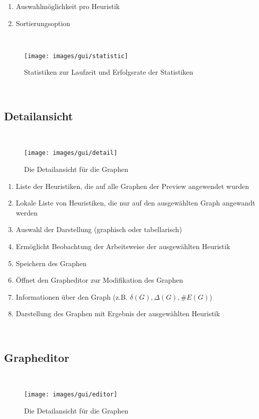 \documentclass{article}
\begin{document}
	\begin{enumerate}[(1)]
		\item{Auswahlmöglichkeit pro Heuristik}
		\item{Sortierungsoption}
	\end{enumerate}
	
	~\begin{figure}[!h]
		\centering
		\texttt{[image: images/gui/statistic]}
		\caption{Statistiken zur Laufzeit und Erfolgsrate der Statistiken}
	\end{figure}
	
	
	
	~\newpage
	\subsection{Detailansicht}
	~\begin{figure}[!h]
		\centering
		\texttt{[image: images/gui/detail]}
		\caption{Die Detailansicht für die Graphen}
	\end{figure}
	
	\FloatBarrier
	
	\begin{enumerate}[(1)]
		\item{Liste der Heuristiken, die auf alle Graphen der Preview angewendet wurden}
		\item{Lokale Liste von Heuristiken, die nur auf den ausgewählten Graph angewandt werden}
		\item{Auswahl der Darstellung (graphisch oder tabellarisch)}
		\item{Ermöglicht Beobachtung der Arbeitsweise der ausgewählten Heuristik}
		\item{Speichern des Graphen}
		\item{Öffnet den Grapheditor zur Modifikation des Graphen}
		\item{Informationen über den Graph (z.B. $\delta (G), \Delta (G), \# E(G)$)}
		\item{Darstellung des Graphen mit Ergebnis der ausgewählten Heuristik}
	\end{enumerate}
	
	
	
	
	~\newpage
	\subsection{Grapheditor}
	~\begin{figure}[!h]
		\centering
		\texttt{[image: images/gui/editor]}
		\caption{Die Detailansicht für die Graphen}
	\end{figure}
	
\end{document}
